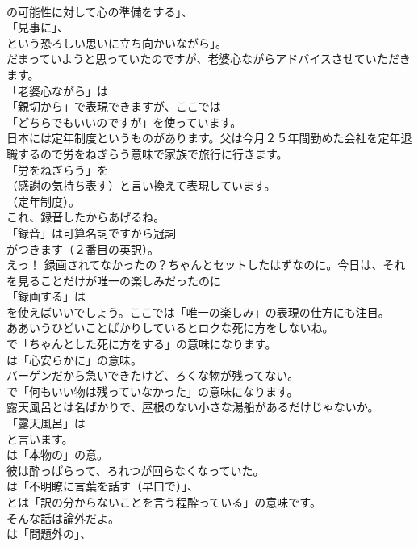 \documentclass[8pt]{extreport}
\begin{document}
\begin{CJK}{UTF8}{min}
\\	の可能性に対して心の準備をする」、
\\	「見事に」、
\\	という恐ろしい思いに立ち向かいながら」。	
\\	だまっていようと思っていたのですが、老婆心ながらアドバイスさせていただきます。 
\\	「老婆心ながら」は
\\	「親切から」で表現できますが、ここでは
\\	「どちらでもいいのですが」を使っています。	
\\	日本には定年制度というものがあります。父は今月２５年間勤めた会社を定年退職するので労をねぎらう意味で家族で旅行に行きます。 
\\	「労をねぎらう」を
\\	（感謝の気持ち表す）と言い換えて表現しています。
\\	（定年制度）。	
\\	これ、録音したからあげるね。 
\\	「録音」は可算名詞ですから冠詞
\\	がつきます（２番目の英訳）。	
\\	えっ！ 録画されてなかったの？ちゃんとセットしたはずなのに。今日は、それを見ることだけが唯一の楽しみだったのに 
\\	「録画する」は
\\	を使えばいいでしょう。ここでは「唯一の楽しみ」の表現の仕方にも注目。	
\\	ああいうひどいことばかりしているとロクな死に方をしないね。 
\\	で「ちゃんとした死に方をする」の意味になります。
\\	は「心安らかに」の意味。	
\\	バーゲンだから急いできたけど、ろくな物が残ってない。 
\\	で「何もいい物は残っていなかった」の意味になります。	
\\	露天風呂とは名ばかりで、屋根のない小さな湯船があるだけじゃないか。 
\\	「露天風呂」は
\\	と言います。
\\	は「本物の」の意。	
\\	彼は酔っぱらって、ろれつが回らなくなっていた。 
\\	は「不明瞭に言葉を話す（早口で）」、
\\	とは「訳の分からないことを言う程酔っている」の意味です。	
\\	そんな話は論外だよ。 
\\	は「問題外の」、

\end{CJK}
\end{document}
